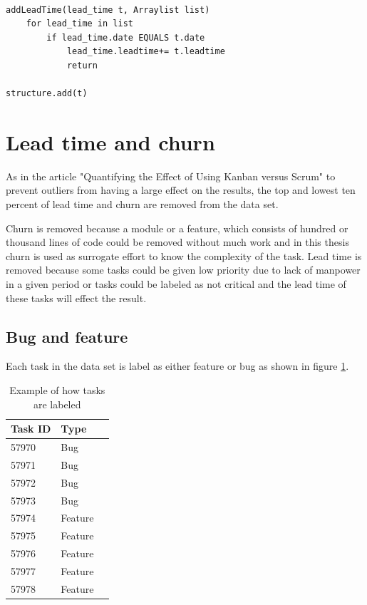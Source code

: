 \documentclass[UKenglish]{ifimaster}  %
\begin{document}
\begin{minipage}{\textwidth}
\begin{lstlisting}[caption=Pseudocode example of lead time is measured, label=LTcode]

addLeadTime(lead_time t, Arraylist list)
	for lead_time in list
		if lead_time.date EQUALS t.date
			lead_time.leadtime+= t.leadtime
			return
			
structure.add(t)
\end{lstlisting}
\end{minipage}
\section{Lead time and churn}
As in the article "Quantifying the Effect of Using Kanban versus Scrum" \parencite{Dag} to prevent outliers from having a large effect on the results, the top and lowest ten percent of lead time and churn are removed from the data set.

Churn is removed because a module or a feature, which consists of hundred or thousand lines of code could be removed without much work and in this thesis churn is used as surrogate effort to know the complexity of the task. Lead time is removed because some tasks could be given low priority due to lack of manpower in a given period or tasks could be labeled as not critical and the lead time of these tasks will effect the result.

\subsection {Bug and feature}
\label{sec:bug}
Each task in the data set is label as either feature or bug as shown in figure \ref{bugsT}. 

\begin{table}[ht]
\begin{center}
    \begin{tabular}{| l | l | p{5cm} |}
    \hline
    Task ID & Type \\ \hline
57970 &	Bug\\ \hline
57971&	Bug\\ \hline
57972&	Bug\\ \hline
57973&	Bug\\ \hline
57974&	Feature\\ \hline
57975&	Feature\\ \hline
57976&	Feature\\ \hline
57977&	Feature\\ \hline
57978&	Feature\\ \hline
    \end{tabular}
\caption{Example of how tasks are labeled}
\label{bugsT} %
\end{center}
\end{table}
\end{document}
